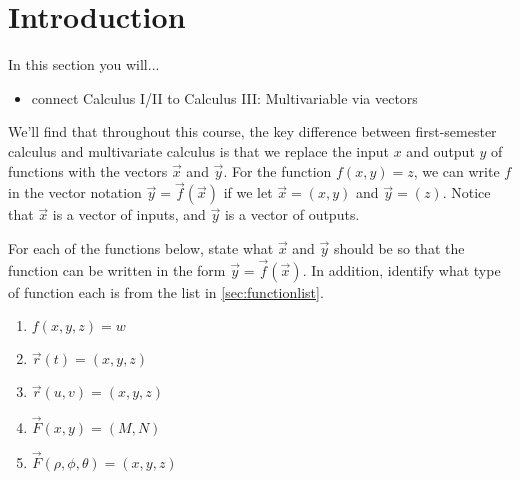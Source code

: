 \section{Introduction}
In this section you will...
\begin{itemize}
	\item connect Calculus I/II to Calculus III: Multivariable via vectors
\end{itemize}

We'll find that throughout this course, the key difference between first-semester calculus and multivariate calculus is that we replace the input $x$ and output $y$ of functions with the vectors $\vec x$ and $\vec y$. For the function $f(x,y)=z$, we can write $f$ in the vector notation $\vec y=\vec f(\vec x)$ if we let $\vec x=(x,y)$ and $\vec y=(z)$. Notice that $\vec x$ is a vector of inputs, and $\vec y$ is a vector of outputs.
 
\begin{problem} 
For each of the functions below, state what $\vec x$ and $\vec y$ should be so that the function can be written in the form $\vec y = \vec f (\vec x)$. In addition, identify what type of function each is from the list in \ref{sec:functionlist}.
\begin{enumerate}
 \item $f(x,y,z)=w$
 \item $\vec r(t)=(x,y,z)$
 \item $\vec r(u,v)=(x,y,z)$
 \item $\vec F(x,y)=(M,N)$
 \item $\vec F(\rho,\phi,\theta)=(x,y,z)$
\end{enumerate}
\end{problem}


